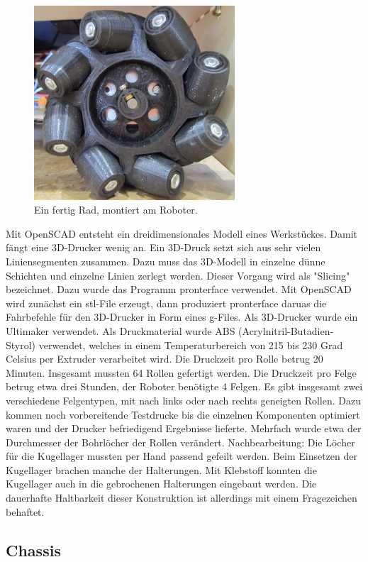 \documentclass[a4paper,bibtotoc,oneside]{scrbook}
\begin{document}
\begin{figure}[htbp]
\centering
\includegraphics[width=75mm]{img/rad.jpg}
\caption{Ein fertig Rad, montiert am Roboter.}\label{rad2}
\end{figure}


Mit OpenSCAD entsteht ein dreidimensionales Modell eines Werkstückes. Damit fängt eine 3D-Drucker wenig an. Ein 3D-Druck setzt sich aus sehr vielen Liniensegmenten zusammen. Dazu muss das 3D-Modell in einzelne dünne Schichten und einzelne Linien zerlegt werden. Dieser Vorgang wird als "Slicing" bezeichnet. Dazu wurde das Programm pronterface verwendet. Mit OpenSCAD wird zunächst ein stl-File erzeugt, dann produziert pronterface daruas die Fahrbefehle für den 3D-Drucker in Form eines g-Files. Als 3D-Drucker wurde ein Ultimaker verwendet. Als Druckmaterial wurde ABS (Acrylnitril-Butadien-Styrol) verwendet, welches in einem Temperaturbereich von 215 bis 230 Grad Celsius per Extruder verarbeitet wird.    
Die Druckzeit pro Rolle betrug 20 Minuten. Insgesamt mussten 64 Rollen gefertigt werden. Die Druckzeit pro Felge betrug etwa drei Stunden, der Roboter benötigte 4 Felgen. Es gibt insgesamt zwei verschiedene Felgentypen, mit nach links oder nach rechts geneigten Rollen. 
Dazu kommen noch vorbereitende Testdrucke bis die einzelnen Komponenten optimiert waren und der Drucker befriedigend Ergebnisse lieferte. 
Mehrfach wurde etwa der Durchmesser der Bohrlöcher der Rollen verändert. Nachbearbeitung: Die Löcher für die Kugellager mussten per Hand passend gefeilt werden. Beim  Einsetzen der Kugellager brachen manche der Halterungen. Mit Klebstoff konnten die Kugellager auch in die gebrochenen Halterungen eingebaut werden. Die dauerhafte Haltbarkeit dieser Konstruktion ist allerdings mit einem Fragezeichen behaftet.

\subsection{Chassis}\thispagestyle{empty}
\end{document}
